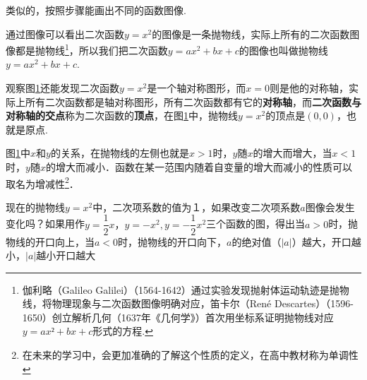 \begin{figure}[h]
    \centering
    \caption{}
    \label{fuc_1}
\end{figure}

类似的，按照步骤能画出不同的函数图像.
\par
通过图像可以看出二次函数\(y=x^2\)的图像是一条抛物线，实际上所有的二次函数图像都是抛物线\footnote{伽利略（Galileo Galilei）（1564-1642）通过实验发现抛射体运动轨迹是抛物线，将物理现象与二次函数图像明确对应，笛卡尔（René Descartes）（1596-1650）创立解析几何（1637年《几何学》）首次用坐标系证明抛物线对应\(y=ax²+bx+c\)形式的方程.}，所以我们把二次函数\(y=ax^2+bx+c\)的图像也叫做抛物线\(y=ax^2+bx+c\).
\par
观察图\ref{fuc_1}还能发现二次函数\(y=x^2\)是一个轴对称图形，而\(x=0\)则是他的对称轴，实际上所有二次函数都是轴对称图形，所有二次函数都有它的\textbf{对称轴}，而\textbf{二次函数与对称轴的交点}称为二次函数的\textbf{顶点}，在图\ref{fuc_1}中，抛物线\(y=x^2\)的顶点是\((0,0)\)，也就是原点.
\par
图\ref{fuc_1}中\(x\)和\(y\)的关系，在抛物线的左侧也就是\(x>1\)时，\(y\)随\(x\)的增大而增大，当\(x<1\)时，\(y\)随\(x\)的增大而减小．函数在某一范围内随着自变量的增大而减小的性质可以取名为增减性\footnote{在未来的学习中，会更加准确的了解这个性质的定义，在高中教材称为单调性}．
\par
现在的抛物线$y=x^2$中，二次项系数的值为１，如果改变二次项系数$a$图像会发生变化吗？如果用作\(y=\dfrac{1}{2}x，y=-x^2, y=-\dfrac{1}{2}x^2\)三个函数的图，得出当\(a>0\)时，抛物线的开口向上，当$a<0$时，抛物线的开口向下，\(a\)的绝对值（$|a|$）越大，开口越小，$|a|$越小开口越大

